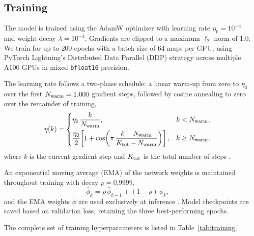 \documentclass[linenumbers,trackchanges, twocolumn]{aastex701}
\begin{document}
\subsection{Training}
\label{subsec:training}

The model is trained using the AdamW optimizer \citep{loshchilov2019decoupled} with learning rate $\eta_0 = 10^{-4}$ and weight decay $\lambda = 10^{-4}$. Gradients are clipped to a maximum $\ell_2$ norm of 1.0. We train for up to 200 epochs with a batch size of 64 maps per GPU, using PyTorch Lightning's Distributed Data Parallel (DDP) strategy across multiple A100 GPUs in mixed \texttt{bfloat16} precision.

The learning rate follows a two-phase schedule: a linear warm-up from zero to $\eta_0$ over the first $N_{\rm warm}=1{,}000$ gradient steps, followed by cosine annealing to zero over the remainder of training, 
\begin{equation}
    \eta(k) =
    \begin{cases}
        \eta_0\,\dfrac{k}{N_{\rm warm}},
            & k < N_{\rm warm}, \\[8pt]
        \dfrac{\eta_0}{2}
        \!\left[1 + \cos\!\left(
            \pi\,\dfrac{k - N_{\rm warm}}{K_{\rm tot} - N_{\rm warm}}
        \right)\right],
            & k \geq N_{\rm warm},
    \end{cases}
    \label{eq:lrsched}
\end{equation}
where $k$ is the current gradient step and $K_{\rm tot}$ is the total number of steps \citep{loshchilov2017sgdr}.

An exponential moving average (EMA) of the network weights is maintained throughout training with decay $\rho = 0.9999$,
\begin{equation}
    \bar{\phi}_k = \rho\,\bar{\phi}_{k-1} + (1-\rho)\,\phi_k,
    \label{eq:ema}
\end{equation}
and the EMA weights $\bar{\phi}$ are used exclusively at inference \citep{karras2022edm}. Model checkpoints are saved based on validation loss, retaining the three best-performing epochs.

The complete set of training hyperparameters is listed in Table~\ref{tab:training}.
\end{document}
